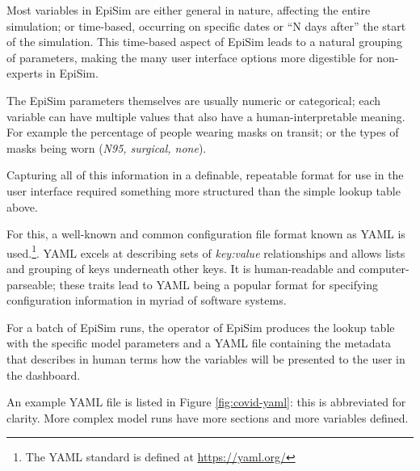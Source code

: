 Most variables in EpiSim are either general in nature, affecting the entire simulation; or time-based, occurring on specific dates or ``N days after'' the start of the simulation. This time-based aspect of EpiSim leads to a natural grouping of parameters, making the many user interface options more digestible for non-experts in EpiSim.

The EpiSim parameters themselves are usually numeric or categorical; each variable can have multiple values that also have a human-interpretable meaning. For example the percentage of people wearing masks on transit; or the types of masks being worn (\emph{N95, surgical, none}).

Capturing all of this information in a definable, repeatable format for use in the user interface required something more structured than the simple lookup table above.

For this, a well-known and common configuration file format known as \gls{YAML} is used.\footnote{The YAML standard is defined at \url{https://yaml.org/}}. YAML excels at describing sets of \emph{key:value} relationships and allows lists and grouping of keys underneath other keys. It is human-readable and computer-parseable; these traits lead to YAML being a popular format for specifying configuration information in myriad of software systems.

For a batch of EpiSim runs, the operator of EpiSim produces the lookup table with the specific model parameters and a YAML file containing the metadata that describes in human terms how the variables will be presented to the user in the dashboard.

An example YAML file is listed in Figure \ref{fig:covid-yaml}: this is abbreviated for clarity. More complex model runs have more sections and more variables defined.

